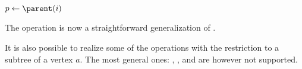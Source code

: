 \begin{algorithmic}
	\State {}
\EndFunction
\end{algorithmic}

\begin{algorithmic}
	\State $p \gets \parent(i)$
	\State {}
\EndFunction
\end{algorithmic}

\begin{algorithmic}
	\State {}
\EndFunction
\end{algorithmic}

The operation \levelAncestor{} is now a straightforward generalization of \enclose{}.

\begin{algorithmic}
		\State {}
	\Else
		\State {}
	\EndIf
\EndFunction
\end{algorithmic}

It is also possible to realize some of the \levelAny{} operations with the restriction to a subtree of a vertex $a$.
The most general ones: \levelSize{}, \levelRank{}, and \levelSelect{} are however not supported.

\begin{algorithmic}
		\State {}
	\Else
		\State {}
	\EndIf
\EndFunction
\end{algorithmic}

\begin{algorithmic}
		\State {}
	\Else
		\State {}
	\EndIf
\EndFunction
\end{algorithmic}

\begin{algorithmic}
	\State {}
\EndFunction
\end{algorithmic}

\begin{algorithmic}
	\State {}
\EndFunction
\end{algorithmic}

